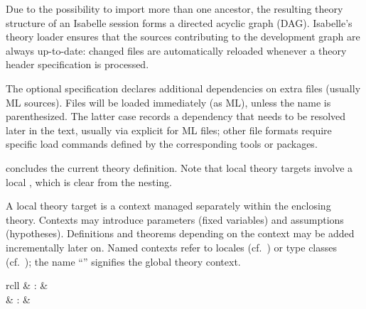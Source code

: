 \begin{isabellebody}
\begin{isamarkuptext}
\begin{description}
  Due to the possibility to import more than one ancestor, the
  resulting theory structure of an Isabelle session forms a directed
  acyclic graph (DAG).  Isabelle's theory loader ensures that the
  sources contributing to the development graph are always up-to-date:
  changed files are automatically reloaded whenever a theory header
  specification is processed.
  
  The optional \hypertarget{keyword.uses}{\hyperlink{keyword.uses}{\mbox{}}} specification declares additional
  dependencies on extra files (usually ML sources).  Files will be
  loaded immediately (as ML), unless the name is parenthesized.  The
  latter case records a dependency that needs to be resolved later in
  the text, usually via explicit \hyperlink{command.use}{\mbox{}} for ML files;
  other file formats require specific load commands defined by the
  corresponding tools or packages.
  
  \item \hyperlink{command.global.end}{\mbox{}} concludes the current theory
  definition.  Note that local theory targets involve a local
  \hyperlink{command.local.end}{\mbox{}}, which is clear from the nesting.

  \end{description}%
\end{isamarkuptext}%
\isamarkuptrue%
%
\isamarkuptrue%
%
\begin{isamarkuptext}%
A local theory target is a context managed separately within the
  enclosing theory.  Contexts may introduce parameters (fixed
  variables) and assumptions (hypotheses).  Definitions and theorems
  depending on the context may be added incrementally later on.  Named
  contexts refer to locales (cf.\ ) or type classes
  (cf.\ ); the name ``'' signifies the
  global theory context.

  \begin{matharray}{rcll}
    \hypertarget{command.context}{\hyperlink{command.context}{\mbox{}}} & : &  \\
    \hypertarget{command.local.end}{\hyperlink{command.local.end}{\mbox{}}} & : &  \\
  \end{matharray}


\end{isamarkuptext}
\end{isabellebody}
